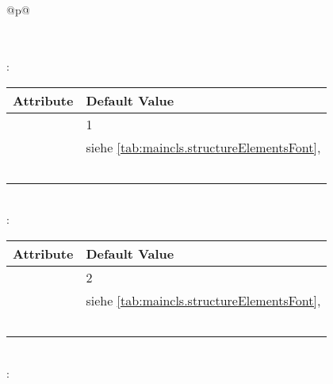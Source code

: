 \begin{longtable}{@{}p{\columnwidth}@{}}
\begin{tabularx}{\linewidth}{ll}
    \PValue{tocnumwidth} & \PValue{1.5em} \\
    \bottomrule
    \end{tabularx} \\
    \addlinespace[\normalbaselineskip]
    : \\*
    \begin{tabularx}{\linewidth}{ll}
    \toprule
    Attribute & Default Value \\
    \midrule
    \PValue{level}       & 1 \\
    \PValue{font}        & siehe \autoref{tab:maincls.structureElementsFont}, 
                           \autopageref{tab:maincls.structureElementsFont} \\
    \PValue{indent}      & \PValue{0pt} \\
    \PValue{beforeskip}  & \PValue{-3.5ex plus -1ex minus -.2ex} \\
    \PValue{afterskip}   & \PValue{2.3ex plus .2ex} \\
    \PValue{tocindent}   & \PValue{1.5em}\\
    \PValue{tocnumwidth} & \PValue{2.3em}\\
    \bottomrule
    \end{tabularx} \\
    \addlinespace[\normalbaselineskip]
    : \\*
    \begin{tabularx}{\linewidth}{ll}
    \toprule
    Attribute & Default Value \\
    \midrule\nopagebreak
    \PValue{level}       & 2 \\
    \PValue{font}        & siehe \autoref{tab:maincls.structureElementsFont}, 
                           \autopageref{tab:maincls.structureElementsFont} \\
    \PValue{indent}      & \PValue{0pt} \\
    \PValue{beforeskip}  & \PValue{-3.25ex plus -1ex minus -.2ex} \\
    \PValue{afterskip}   & \PValue{1.5ex plus .2ex} \\
    \PValue{tocindent}   & \PValue{3.8em}\\
    \PValue{tocnumwidth} & \PValue{3.2em}\\
    \bottomrule
    \end{tabularx} \\
    \addlinespace[\normalbaselineskip]
    : \\*
    \begin{tabularx}{\linewidth}{ll}

\end{tabularx}
\end{longtable}
